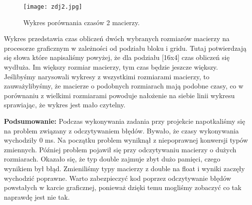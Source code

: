 \documentclass[a4paper,12pt]{article}
\begin{document}
\begin{wrapfigure}{r}{0.5\textwidth}
	\vspace{-40pt}
	\begin{center}
		\texttt{[image: zdj2.jpg]}
	\end{center}
	\vspace{-20pt}
	\caption{Wykres porównania czasów 2 macierzy.}
	\vspace{35pt}
\end{wrapfigure}


Wykres przedstawia czas obliczeń dwóch wybranych rozmiarów macierzy na procesorze graficznym w zależności od podziału bloku i gridu. Tutaj potwierdzają się słowa które napisaliśmy powyżej, że dla podziału [16x4] czas obliczeń się wydłuża. Im większy rozmiar macierzy, tym czas będzie jeszcze większy. Jeślibyśmy narysowali wykresy z wszystkimi rozmiarami macierzy, to zauważylibyśmy, że macierze o podobnych rozmiarach mają podobne czasy, co w porównaniu z wielkimi rozmiarami powoduje nałożenie na siebie linii wykresu sprawiając, że wykres jest mało czytelny.

\textbf{Podsumowanie:} 
Podczas wykonywania zadania przy projekcie napotkaliśmy się na problem związany z odczytywaniem błędów. Bywało, że czasy wykonywania wychodziły 0 ms. Na początku problem wyniknął z niepoprawnej konwersji typów zmiennych. Później problem pojawił się przy odczytywaniu macierzy o dużych rozmiarach. Okazało się, że typ double zajmuje zbyt dużo pamięci, czego wynikiem był błąd. Zmieniliśmy typy macierzy z double na float i wyniki zaczęły wychodzić poprawne. Warto zabezpieczyć kod poprzez odczytywanie błędów powstałych w karcie graficznej, ponieważ dzięki temu mogliśmy zobaczyć co tak naprawdę jest nie tak.
\end{document}
